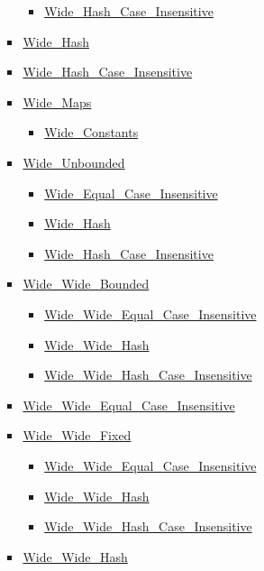 \begin{multicols*}{\columnnr}
\begin{scriptsize}
\begin{itemize}[leftmargin=0mm]
\begin{itemize}[leftmargin=5mm]
\begin{itemize}[leftmargin=5mm]
\begin{itemize}[leftmargin=5mm]
	  \item[] \href{\adarmlink{RM-A-4-7.html}}{Wide\_Hash\_Case\_Insensitive}
	  \end{itemize}
	\item[] \href{\adarmlink{RM-A-4-7.html}}{Wide\_Hash}
	\item[] \href{\adarmlink{RM-A-4-7.html}}{Wide\_Hash\_Case\_Insensitive}
	\item[] \href{\adarmlink{RM-A-4-7.html}}{Wide\_Maps}
	  \begin{itemize}[leftmargin=5mm]
	  \item[] \href{\adarmlink{RM-A-4-7.html}}{Wide\_Constants}
	  \end{itemize}
	\item[] \href{\adarmlink{RM-A-4-7.html}}{Wide\_Unbounded}
	  \begin{itemize}[leftmargin=5mm]
	  \item[] \href{\adarmlink{RM-A-4-7.html}}{Wide\_Equal\_Case\_Insensitive}
	  \item[] \href{\adarmlink{RM-A-4-7.html}}{Wide\_Hash}
	  \item[] \href{\adarmlink{RM-A-4-7.html}}{Wide\_Hash\_Case\_Insensitive}
	  \end{itemize}
	\item[] \href{\adarmlink{RM-A-4-8.html}}{Wide\_Wide\_Bounded}
	  \begin{itemize}[leftmargin=5mm]
	  \item[] \href{\adarmlink{RM-A-4-8.html}}{Wide\_Wide\_Equal\_Case\_Insensitive}
	  \item[] \href{\adarmlink{RM-A-4-8.html}}{Wide\_Wide\_Hash}
	  \item[] \href{\adarmlink{RM-A-4-8.html}}{Wide\_Wide\_Hash\_Case\_Insensitive}
	  \end{itemize}
	\item[] \href{\adarmlink{RM-A-4-8.html}}{Wide\_Wide\_Equal\_Case\_Insensitive}
	\item[] \href{\adarmlink{RM-A-4-8.html}}{Wide\_Wide\_Fixed}
	  \begin{itemize}[leftmargin=5mm]
	  \item[] \href{\adarmlink{RM-A-4-8.html}}{Wide\_Wide\_Equal\_Case\_Insensitive}
	  \item[] \href{\adarmlink{RM-A-4-8.html}}{Wide\_Wide\_Hash}
	  \item[] \href{\adarmlink{RM-A-4-8.html}}{Wide\_Wide\_Hash\_Case\_Insensitive}
	  \end{itemize}
	\item[] \href{\adarmlink{RM-A-4-8.html}}{Wide\_Wide\_Hash}

\end{itemize}
\end{itemize}
\end{itemize}
\end{scriptsize}
\end{multicols*}
